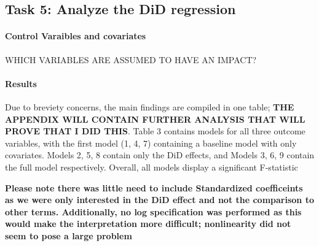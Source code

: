 \documentclass[a4paper]{article}
\begin{document}
\subsection{Task 5: Analyze the DiD regression}


\paragraph{Control Varaibles and covariates} WHICH VARIABLES ARE ASSUMED TO HAVE AN IMPACT? 

\paragraph{Results} Due to breviety concerns, the main findings are compiled in one table; \textbf{THE APPENDIX WILL CONTAIN FURTHER ANALYSIS THAT WILL PROVE THAT I DID THIS}.
Table 3 contains models for all three outcome variables, with the first model (1, 4, 7) containing a baseline model with only covariates. Models 2, 5, 8 contain only the DiD effects, and Models 3, 6, 9 contain the full model respectively. 
Overall, all models display a significant F-statistic

\textbf{Please note there was little need to include Standardized coefficeints as we were only interested in the DiD effect and not the comparison to other terms. Additionally, no log specification was performed as this would make the interpretation more difficult; nonlinearity did not seem to pose a large problem}
\end{document}
